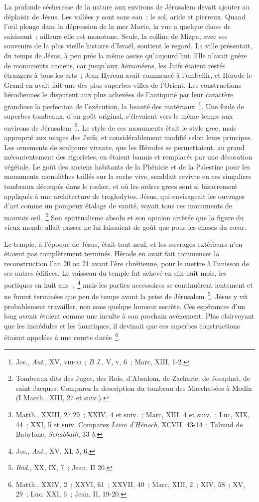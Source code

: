 \documentclass[french,twoside]{book} %
\begin{document}
La profonde sécheresse de la nature aux environs de Jérusalem devait ajouter au déplaisir de Jésus. Les vallées y sont sans eau ; le sol, aride et pierreux. Quand l’œil plonge dans la dépression de la mer Morte, la vue a quelque chose de saisissant ; ailleurs elle est monotone. Seule, la colline de Mizpa, avec ses souvenirs de la plus vieille histoire d’Israël, soutient le regard. La ville présentait, du temps de Jésus, à peu près la même assise qu’aujourd’hui. Elle n’avait guère de monuments anciens, car jusqu’aux Asmonéens, les Juifs étaient restés étrangers à tous les arts ; Jean Hyrcan avait commencé à l’embellir, et Hérode le Grand en avait fait une des plus superbes villes de l’Orient. Les constructions hérodiennes le disputent aux plus achevées de l’antiquité par leur caractère grandiose la perfection de l’exécution, la beauté des matériaux \footnote{ Jos., {\itshape Ant}., XV, \textsc{viii-xi} ; {\itshape B.J.}, V, \textsc{v}, 6 ; Marc, XIII, 1-2.}. Une foule de superbes tombeaux, d’un goût original, s’élevaient vers le même temps aux environs de Jérusalem \footnote{Tombeaux dits des Juges, des Rois, d’Absalom, de Zacharie, de Josaphat, de saint Jacques. Comparez la description du tombeau des Macchabées à Modin (I Macch., XIII, 27 et suiv.).}. Le style de ces monuments était le style grec, mais approprié aux usages des Juifs, et considérablement modifié selon leurs principes. Les ornements de sculpture vivante, que les Hérodes se permettaient, au grand mécontentement des rigoristes, en étaient bannis et remplacés par une décoration végétale. Le goût des anciens habitants de la Phénicie et de la Palestine pour les monuments monolithes taillés sur la roche vive, semblait revivre en ces singuliers tombeaux découpés dans le rocher, et où les ordres grecs sont si bizarrement appliqués à une architecture de troglodytes. Jésus, qui envisageait les ouvrages d’art comme un pompeux étalage de vanité, voyait tous ces monuments de mauvais œil. \footnote{ Matth., XXIII, 27,29 ; XXIV, 4 et suiv. ; Marc, XIII, 4 et suiv. ; Luc, XIX, 44 ; XXI, 5 et suiv. Comparez {\itshape Livre d’Hénoch}, XCVII, 43-14 ; Talmud de Babylone, {\itshape Schabbath}, 33 {\itshape b}.} Son spiritualisme absolu et son opinion arrêtée que la figure du vieux monde allait passer ne lui laissaient de goût que pour les choses du cœur.\par
Le temple, à l’époque de Jésus, était tout neuf, et les ouvrages extérieurs n’en étaient pas complètement terminés. Hérode en avait fait commencer la reconstruction l’an 20 ou 21 avant l’ère chrétienne, pour le mettre à l’unisson de ses autres édifices. Le vaisseau du temple fut achevé en dix-huit mois, les portiques en huit ans ; \footnote{ Jos., {\itshape Ant.}, XV, XL 5, 6.} mais les parties accessoires se continuèrent lentement et ne furent terminées que peu de temps avant la prise de Jérusalem \footnote{{\itshape Ibid.}, XX, IX, 7 ; Jean, II 20.}. Jésus y vit probablement travailler, non sans quelque humeur secrète. Ces espérances d’un long avenir étaient comme une insulte à son prochain avènement. Plus clairvoyant que les incrédules et les fanatiques, il devinait que ces superbes constructions étaient appelées à une courte durée \footnote{Matth., XXIV, 2 ; XXVI, 61 ; XXVII, 40 ; Marc, XIII, 2 ; XIV, 58 ; XV, 29 ; Luc, XXI, 6 ; Jean, II, 19-20.}.\par
\end{document}
